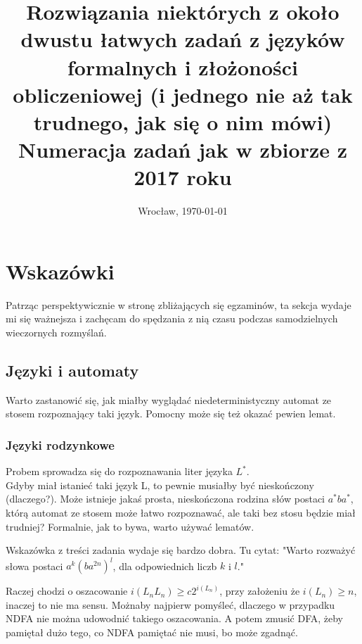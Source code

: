 \documentclass[a4paper,11pt]{article}
\date{Wrocław, \today}
\title{\LARGE{\textbf{Rozwiązania niektórych z około dwustu łatwych zadań z języków formalnych i złożoności obliczeniowej 
(i jednego nie aż tak trudnego, jak się o nim mówi)}\\\Large{Numeracja zadań jak w zbiorze z 2017 roku}}}
\author{}
\newenvironment{zadanie}[1]
  {\renewcommand\theinnercustomthm{#1}\innercustomthm}
  {\endinnercustomthm}
\begin{document}
\maketitle

\section{Wskazówki}

Patrząc perspektywicznie w stronę zbliżających się egzaminów, ta sekcja wydaje mi się ważnejsza i zachęcam do spędzania z nią
czasu podczas samodzielnych wieczornych rozmyślań.

\subsection{Języki i automaty}

\begin{zadanie}{63}
Warto zastanowić się, jak miałby wyglądać niedeterministyczny automat ze stosem rozpoznający taki język. Pomocny może się też
okazać pewien lemat.
\end{zadanie}

\subsubsection{Języki rodzynkowe}

\begin{zadanie}{71}
Probem sprowadza się do rozpoznawania liter języka $L^*$. \\
Gdyby miał istanieć taki język L, to pewnie musiałby być nieskończony (dlaczego?). Może istnieje jakaś prosta, nieskończona
rodzina słów postaci $a^*ba^*$, którą automat ze stosem może łatwo rozpoznawać, ale taki bez stosu będzie miał trudniej?
Formalnie, jak to bywa, warto używać lematów.
\end{zadanie}


\begin{zadanie}{72}
Wskazówka z treści zadania wydaje się bardzo dobra. Tu cytat: "Warto rozważyć słowa postaci $a^k(ba^{2n})^l$, dla odpowiednich
liczb $k$ i $l$."
\end{zadanie}

\begin{zadanie}{73}
Raczej chodzi o oszacowanie $i(L_nL_n) \geqslant c2^{i(L_n)}$, przy założeniu że $i(L_n) \geqslant n$, inaczej to nie ma sensu.
Możnaby najpierw pomyśleć, dlaczego w przypadku NDFA nie można udowodnić takiego oszacowania. A potem zmusić DFA, żeby pamiętał
dużo tego, co NDFA pamiętać nie musi, bo może zgadnąć. 
\end{zadanie}
\end{document}
